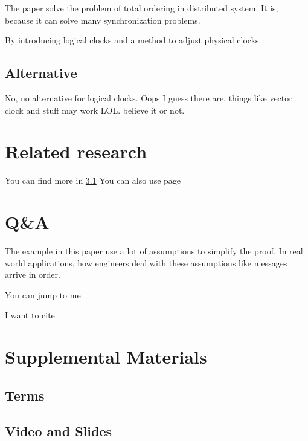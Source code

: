 \documentclass[12pt,a4paper,oneside]{article}
\begin{document}
The paper solve the problem of total ordering in distributed system.
It is, because it can solve many synchronization problems.

By introducing logical clocks and a method to adjust physical clocks.

\subsection{Alternative}

No, no alternative for logical clocks. Oops I guess there are, things
like vector clock and stuff may work LOL. believe it or not.

\section{Related research}

You can find more in \ref{l1}
You can also use page \pageref{l1}

\section{Q\&A}

The example in this paper use a lot of assumptions to simplify the proof.
In real world applications, how engineers deal with these assumptions like messages
arrive in order.


You can jump to me

I want to cite\cite{lamport1978time}

\section{Supplemental Materials}

\subsection{Terms} \label{l1}

\subsection{Video and Slides}

\printbibliography
\end{document}

